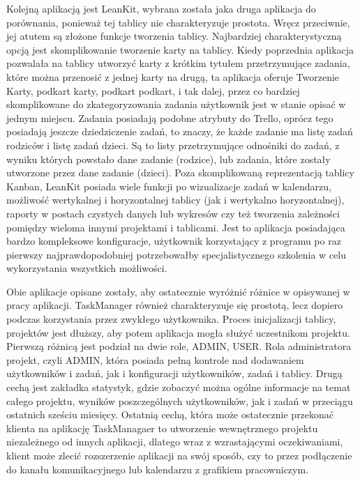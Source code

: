 \indent  Kolejną aplikacją jest LeanKit, wybrana została jaka druga aplikacja do porównania, ponieważ tej tablicy nie charakteryzuje prostota. Wręcz przeciwnie, jej atutem są złożone funkcje tworzenia tablicy. Najbardziej charakterystyczną opcją jest skomplikowanie tworzenie karty na tablicy. Kiedy poprzednia aplikacja pozwalała  na tablicy utworzyć karty z krótkim tytułem przetrzymujące zadania, które można przenosić z jednej karty na drugą, ta aplikacja oferuje Tworzenie Karty, podkart karty, podkart podkart, i tak dalej, przez co bardziej skomplikowane do zkategoryzowania zadania użytkownik jest w stanie opisać w jednym miejscu. Zadania posiadają podobne atrybuty do Trello, oprócz tego posiadają jeszcze dziedziczenie zadań, to znaczy, że każde zadanie ma listę zadań rodziców i listę zadań dzieci. Są to listy przetrzymujące odnośniki do zadań, z wyniku których powstało dane zadanie (rodzice), lub zadania, które zostały utworzone przez dane zadanie (dzieci). 
Poza skomplikowaną reprezentacją tablicy Kanban, LeanKit posiada wiele funkcji po wizualizacje zadań w kalendarzu, możliwość wertykalnej i horyzontalnej tablicy (jak i wertykalno horyzontalnej), raporty w postach czystych danych lub wykresów czy też tworzenia zależności pomiędzy wieloma innymi projektami i tablicami.
Jest to aplikacja posiadająca bardzo kompleksowe konfiguracje, użytkownik korzystający z programu po raz pierwszy najprawdopodobniej potrzebowałby specjalistycznego szkolenia w celu wykorzystania wszystkich możliwości.


\indent Obie aplikacje opisane zostały, aby ostatecznie wyróżnić różnice w opisywanej w pracy aplikacji. TaskManager również charakteryzuje się prostotą, lecz dopiero podczas korzystania przez zwykłego użytkownika. Proces inicjalizacji tablicy, projektów jest dłuższy, aby potem aplikacja mogła służyć uczestnikom projektu.
Pierwszą różnicą jest podział na dwie role, ADMIN, USER. Rola administratora projekt, czyli ADMIN, która posiada pełną kontrole nad dodawaniem użytkowników i zadań, jak i konfiguracji użytkowników, zadań i tablicy.
Drugą cechą jest zakładka statystyk, gdzie zobaczyć można ogólne informacje na temat całego projektu, wyników poszczególnych użytkowników, jak i zadań w przeciągu ostatnich sześciu miesięcy.
Ostatnią cechą, która może ostatecznie przekonać klienta na aplikację TaskManagaer to utworzenie wewnętrznego projektu niezależnego od innych aplikacji, dlatego wraz z wzrastającymi oczekiwaniami, klient może zlecić rozszerzenie aplikacji na swój sposób, czy to przez podłączenie do kanału komunikacyjnego lub kalendarzu z grafikiem pracowniczym.





